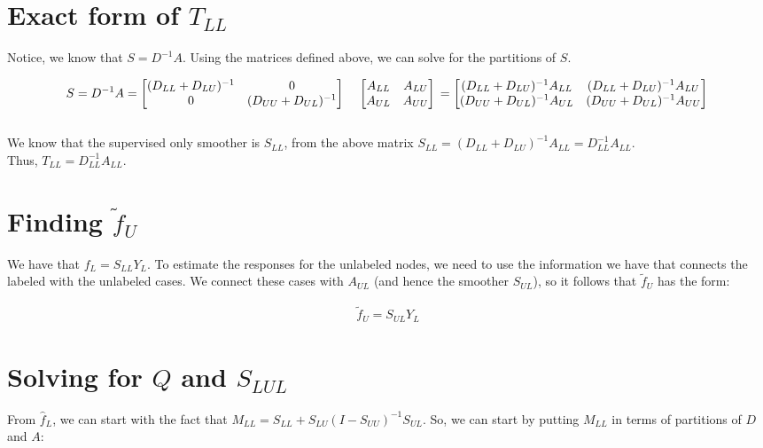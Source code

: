 \documentclass[a4paper]{article}
\begin{document}
\section{Exact form of $T_{LL}$}
Notice, we know that $S = D^{-1}A$. Using the matrices defined above,
we can solve for the partitions of $S$.  

$$
S= D^{-1}A = 
\begin{bmatrix}
     (D_{LL} + D_{LU})^{-1} & 0 \\
     0 & (D_{UU} + D_{UL})^{-1}
\end{bmatrix}\\
\quad
\begin{bmatrix}
     A_{LL} & A_{LU} \\
     A_{UL} & A_{UU} 
\end{bmatrix}\\
=
\begin{bmatrix}
     (D_{LL} + D_{LU})^{-1}A_{LL} & (D_{LL} + D_{LU})^{-1}A_{LU} \\
     (D_{UU} + D_{UL})^{-1}A_{UL} & (D_{UU} + D_{UL})^{-1}A_{UU} 
\end{bmatrix}\\
$$\\

We know that the supervised only smoother is $S_{LL}$, from the above matrix $S_{LL} = (D_{LL} + D_{LU})^{-1}A_{LL} = D_{LL}^{-1}A_{LL}$.\\
Thus, $T_{LL} = D_{LL}^{-1}A_{LL}$.\\

\section{Finding $\widetilde{f}_{U}$}
We have that $f_L = S_{LL}Y_L$.  To estimate the responses for the
unlabeled nodes, we need to use the information we have that connects
the labeled with the unlabeled cases.  We connect these cases with
$A_{UL}$ (and hence the smoother $S_{UL}$), so it follows that
$\widetilde{f}_U$ has the form: 

\begin{align*}
  \widetilde{f}_U = S_{UL}Y_L
\end{align*}


\section{Solving for $Q$ and $S_{LUL}$}

From $\hat{f}_{L}$, we can start with the fact that $M_{LL} = S_{LL} +
S_{LU}(I - S_{UU})^{-1}S_{UL}$. So, we can start by putting $M_{LL}$
in terms of partitions of $D$ and $A$:\\ 
\end{document}
